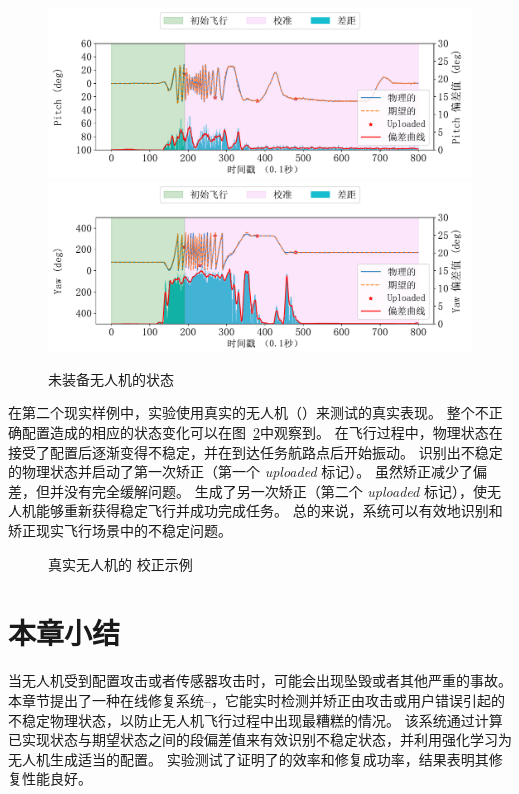 \begin{figure}[htb]
\begin{minipage}{0.49\linewidth}
\includegraphics[width=\linewidth]{fig/fix/fix/fix_thrust_pitch.pdf}\quad
\includegraphics[width=\linewidth]{fig/fix/fix/fix_thrust_yaw.pdf}
\caption{未装备\nyctea 无人机的状态}
\label{subfig:fix_repair}
\end{minipage}


\end{figure}

在第二个现实样例中，实验使用真实的无人机（）来测试\nyctea 的真实表现。 
整个不正确配置造成的相应的状态变化可以在图~\ref{fig:fix_deviation_change_real}中观察到。
在飞行过程中，物理状态在接受了配置后逐渐变得不稳定，并在到达任务航路点后开始振动。
\nyctea 识别出不稳定的物理状态并启动了第一次矫正（第一个 \emph{uploaded} 标记）。
虽然矫正减少了偏差，但并没有完全缓解问题。
\nyctea 生成了另一次矫正（第二个 \emph{uploaded} 标记），使无人机能够重新获得稳定飞行并成功完成任务。
总的来说，\nyctea 系统可以有效地识别和矫正现实飞行场景中的不稳定问题。


\begin{figure}[htb]
\caption{真实无人机的 \nyctea 校正示例}
\label{fig:fix_deviation_change_real}
\end{figure}


\section{本章小结}
当无人机受到配置攻击或者传感器攻击时，可能会出现坠毁或者其他严重的事故。
本章节提出了一种在线修复系统--\nyctea ，它能实时检测并矫正由攻击或用户错误引起的不稳定物理状态，以防止无人机飞行过程中出现最糟糕的情况。
该系统通过计算已实现状态与期望状态之间的段偏差值来有效识别不稳定状态，并利用强化学习为无人机生成适当的配置。
实验测试了证明了\nyctea 的效率和修复成功率，结果表明其修复性能良好。